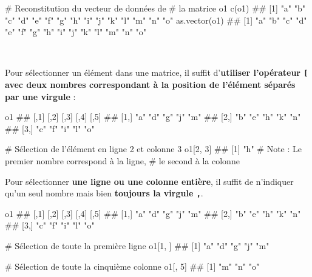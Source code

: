 \documentclass[12pt,twosided, notitlepage]{book}
\newenvironment{Shaded}{}{}
\newcommand{\KeywordTok}[1]{\textcolor[rgb]{0.00,0.00,1.00}{{#1}}}
\newcommand{\DecValTok}[1]{{#1}}
\newcommand{\CommentTok}[1]{\textcolor[rgb]{0.00,0.50,0.00}{{#1}}}
\newcommand{\NormalTok}[1]{{#1}}
\renewenvironment{Shaded}{\begin{snugshade}}{\end{snugshade}}
\begin{document}
\begin{Shaded}
\begin{Highlighting}[]
\CommentTok{# Reconstitution du vecteur de données de }
\CommentTok{# la matrice o1}
\KeywordTok{c}\NormalTok{(o1)}
  \NormalTok{##  [1] "a" "b" "c" "d" "e" "f" "g" "h" "i" "j" "k" "l" "m" "n" "o"}
\KeywordTok{as.vector}\NormalTok{(o1)}
  \NormalTok{##  [1] "a" "b" "c" "d" "e" "f" "g" "h" "i" "j" "k" "l" "m" "n" "o"}
\end{Highlighting}
\end{Shaded}

~

Pour sélectionner un élément dans une matrice, il suffit
d'\textbf{utiliser l'opérateur \texttt{{[}} avec deux nombres
correspondant à la position de l'élément séparés par une
virgule}\index{\texttt{[}|textbf} :

\begin{Shaded}
\begin{Highlighting}[]
\NormalTok{o1}
  \NormalTok{##      [,1] [,2] [,3] [,4] [,5]}
  \NormalTok{## [1,] "a"  "d"  "g"  "j"  "m" }
  \NormalTok{## [2,] "b"  "e"  "h"  "k"  "n" }
  \NormalTok{## [3,] "c"  "f"  "i"  "l"  "o"}

\CommentTok{# Sélection de l'élément en ligne 2 et colonne 3}
\NormalTok{o1[}\DecValTok{2}\NormalTok{, }\DecValTok{3}\NormalTok{]}
  \NormalTok{## [1] "h"}
\CommentTok{# Note : Le premier nombre correspond à la ligne,}
\CommentTok{# le second à la colonne}
\end{Highlighting}
\end{Shaded}

Pour sélectionner \textbf{une ligne ou une colonne entière}, il suffit
de n'indiquer qu'un seul nombre mais bien \textbf{toujours la virgule
\texttt{,}}.

\begin{Shaded}
\begin{Highlighting}[]
\NormalTok{o1}
  \NormalTok{##      [,1] [,2] [,3] [,4] [,5]}
  \NormalTok{## [1,] "a"  "d"  "g"  "j"  "m" }
  \NormalTok{## [2,] "b"  "e"  "h"  "k"  "n" }
  \NormalTok{## [3,] "c"  "f"  "i"  "l"  "o"}

\CommentTok{# Sélection de toute la première ligne}
\NormalTok{o1[}\DecValTok{1}\NormalTok{, ]}
  \NormalTok{## [1] "a" "d" "g" "j" "m"}

\CommentTok{# Sélection de toute la cinquième colonne}
\NormalTok{o1[, }\DecValTok{5}\NormalTok{]}
  \NormalTok{## [1] "m" "n" "o"}
\end{Highlighting}
\end{Shaded}
\end{document}
